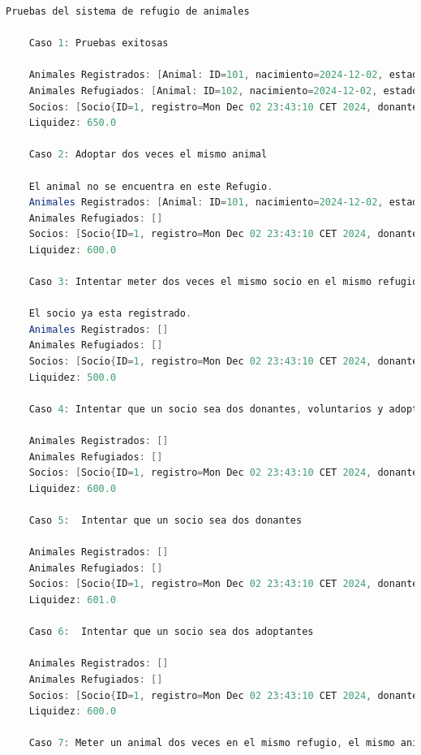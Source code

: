 \begin{lstlisting}[style = javaNormal, language=Java]
    Pruebas del sistema de refugio de animales

    Caso 1: Pruebas exitosas
    
    Animales Registrados: [Animal: ID=101, nacimiento=2024-12-02, estado=ADOPTADO, Animal: ID=102, nacimiento=2024-12-02, estado=DISPONIBLE]
    Animales Refugiados: [Animal: ID=102, nacimiento=2024-12-02, estado=DISPONIBLE]
    Socios: [Socio{ID=1, registro=Mon Dec 02 23:43:10 CET 2024, donante=Donante 1, voluntario=Voluntario 1, adoptante=Adoptante 1}]
    Liquidez: 650.0
    
    Caso 2: Adoptar dos veces el mismo animal
    
    El animal no se encuentra en este Refugio.
    Animales Registrados: [Animal: ID=101, nacimiento=2024-12-02, estado=ADOPTADO]
    Animales Refugiados: []
    Socios: [Socio{ID=1, registro=Mon Dec 02 23:43:10 CET 2024, donante=Donante 1, voluntario=Voluntario 1, adoptante=Adoptante 1}]
    Liquidez: 600.0
    
    Caso 3: Intentar meter dos veces el mismo socio en el mismo refugio
    
    El socio ya esta registrado.
    Animales Registrados: []
    Animales Refugiados: []
    Socios: [Socio{ID=1, registro=Mon Dec 02 23:43:10 CET 2024, donante=null, voluntario=null, adoptante=null}]
    Liquidez: 500.0
    
    Caso 4: Intentar que un socio sea dos donantes, voluntarios y adoptantes
    
    Animales Registrados: []
    Animales Refugiados: []
    Socios: [Socio{ID=1, registro=Mon Dec 02 23:43:10 CET 2024, donante=Donante 1, voluntario=Voluntario 1, adoptante=Adoptante 1}]
    Liquidez: 600.0
    
    Caso 5:  Intentar que un socio sea dos donantes
    
    Animales Registrados: []
    Animales Refugiados: []
    Socios: [Socio{ID=1, registro=Mon Dec 02 23:43:10 CET 2024, donante=Donante 1, voluntario=Voluntario 1, adoptante=Adoptante 1}]
    Liquidez: 601.0
    
    Caso 6:  Intentar que un socio sea dos adoptantes
    
    Animales Registrados: []
    Animales Refugiados: []
    Socios: [Socio{ID=1, registro=Mon Dec 02 23:43:10 CET 2024, donante=Donante 1, voluntario=Voluntario 1, adoptante=Adoptante 1}]
    Liquidez: 600.0
    
    Caso 7: Meter un animal dos veces en el mismo refugio, el mismo animal y luego dos distintos, desde refugio y desde voluntario
    

\end{lstlisting}
